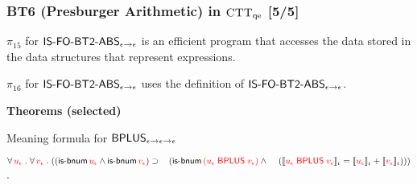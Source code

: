 \documentclass[t,12pt,numbers,fleqn]{beamer}
\newcommand{\churchqe}{$\mbox{\sc CTT}_{\rm qe}$}
\newcommand{\syn}[1]{\textcolor{red}{#1}}
\begin{document}

\begin{frame}
\frametitle{BT6 (Presburger Arithmetic) in {\churchqe} [5/5]}
\small
\bi

  \item[]

  \be

    \setcounter{enumi}{14}

    \item $\pi_{15}$ for $\mbox{\sf IS-FO-BT2-ABS}_{\epsilon \rightarrow
      \epsilon}$ is an efficient program that accesses the data stored
      in the data structures that represent expressions.

    \item $\pi_{16}$ for $\mbox{\sf IS-FO-BT2-ABS}_{\epsilon \rightarrow
      \epsilon}$ uses the definition of
      $\mbox{\sf IS-FO-BT2-ABS}_{\epsilon \rightarrow \epsilon}$.

  \ee

  \item[] \textbf{Theorems (selected)}

    \be

      \setcounter{enumi}{2}

      \item Meaning formula for 
      $\mbox{\sf BPLUS}_{\epsilon \rightarrow \epsilon \rightarrow \epsilon}$

      $\ForallApp \syn{u_\epsilon} \mdot \ForallApp \syn{v_\epsilon} \mdot
      ((\mname{is-bnum} \, \syn{u_\epsilon} \Andd \mname{is-bnum} \, \syn{v_\epsilon}) 
      \Implies {}\newline
      \hspace*{2ex}(\mname{is-bnum} \, 
      \syn{(u_\epsilon \; \mname{BPLUS} \; v_\epsilon)} \Andd {}\newline
      \hspace*{2.6ex}(\sembrack{\syn{u_\epsilon \; \mname{BPLUS} \; 
      v_\epsilon}}_\iota = 
      \sembrack{\syn{u_\epsilon}}_\iota + \sembrack{\syn{v_\epsilon}}_\iota)))$.

    \ee

\ei
\end{frame}

\end{document}
